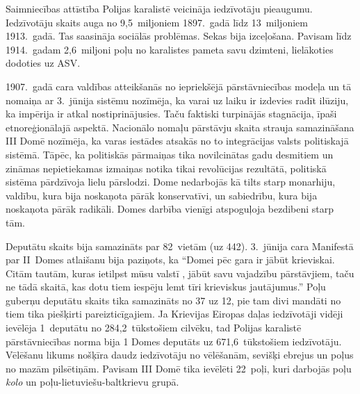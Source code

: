 \documentclass[twoside,a5paper,12pt,fleqn,openany]{extbook}
\newcommand{\pltxti}[1]{\textit{\textpolish{#1}}}
\begin{document}
Saimniecības attīstība Polijas karalistē veicināja iedzīvotāju pieaugumu. Iedzīvotāju skaits auga no 9,5~miljoniem 1897.~gadā līdz 13~miljoniem 1913.~gadā. Tas saasināja sociālās problēmas. Sekas bija izceļošana. Pavisam līdz 1914.~gadam 2,6~miljoni poļu no karalistes pameta savu dzimteni, lielākoties dodoties uz ASV.

1907.~gadā cara valdības atteikšanās no iepriekšējā pārstāvniecības modeļa un tā nomaiņa ar 3.~jūnija sistēmu nozīmēja, ka varai uz laiku ir izdevies radīt ilūziju, ka impērija ir atkal nostiprinājusies. Taču faktiski turpinājās stagnācija, īpaši etnoreģionālajā aspektā. Nacionālo nomaļu pārstāvju skaita strauja samazināšana III Domē nozīmēja, ka varas iestādes atsakās no to integrācijas valsts politiskajā sistēmā. Tāpēc, ka politiskās pārmaiņas tika novilcinātas gadu desmitiem un zināmas nepietiekamas izmaiņas notika tikai revolūcijas rezultātā, politiskā sistēma pārdzīvoja lielu pārslodzi. Dome nedarbojās kā tilts starp monarhiju, valdību, kura bija noskaņota pārāk konservatīvi, un sabiedrību, kura bija noskaņota pārāk radikāli. Domes darbība vienīgi atspoguļoja bezdibeni starp tām.

Deputātu skaits  bija samazināts par 82~vietām (uz 442). 3.~jūnija cara Manifestā par II~Domes atlaišanu bija paziņots, ka ``Domei pēc gara ir jābūt krieviskai. Citām tautām, kuras ietilpst mūsu valstī , jābūt savu vajadzību pārstāvjiem, taču ne tādā skaitā, kas dotu tiem iespēju lemt tīri krieviskus jautājumus.'' Poļu guberņu deputātu skaits tika samazināts no 37 uz 12, pie tam divi mandāti no tiem tika piešķirti pareizticīgajiem. Ja Krievijas Eiropas daļas iedzīvotāji vidēji ievēlēja 1~deputātu no 284,2~tūkstošiem cilvēku, tad Polijas karalistē pārstāvniecības norma bija 1 Domes deputāts uz 671,6~tūkstošiem iedzīvotāju. Vēlēšanu likums nošķīra daudz iedzīvotāju no vēlēšanām, sevišķi ebrejus un poļus no mazām pilsētiņām. Pavisam III Domē tika ievēlēti 22~poļi, kuri darbojās poļu \pltxti{kolo} un poļu-lietuviešu-baltkrievu grupā.
\end{document}
